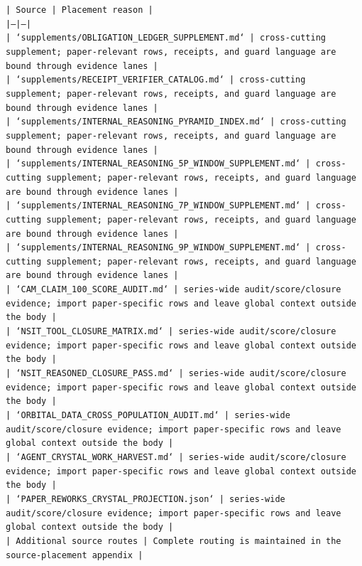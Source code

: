 \documentclass[11pt]{article}
\begin{document}
\noindent\texttt{| Source | Placement reason |}\\
\noindent\texttt{|---|---|}\\
\noindent\texttt{| `supplements/OBLIGATION\_LEDGER\_SUPPLEMENT.md` | cross-cutting supplement; paper-relevant rows, receipts, and guard language are bound through evidence lanes |}\\
\noindent\texttt{| `supplements/RECEIPT\_VERIFIER\_CATALOG.md` | cross-cutting supplement; paper-relevant rows, receipts, and guard language are bound through evidence lanes |}\\
\noindent\texttt{| `supplements/INTERNAL\_REASONING\_PYRAMID\_INDEX.md` | cross-cutting supplement; paper-relevant rows, receipts, and guard language are bound through evidence lanes |}\\
\noindent\texttt{| `supplements/INTERNAL\_REASONING\_5P\_WINDOW\_SUPPLEMENT.md` | cross-cutting supplement; paper-relevant rows, receipts, and guard language are bound through evidence lanes |}\\
\noindent\texttt{| `supplements/INTERNAL\_REASONING\_7P\_WINDOW\_SUPPLEMENT.md` | cross-cutting supplement; paper-relevant rows, receipts, and guard language are bound through evidence lanes |}\\
\noindent\texttt{| `supplements/INTERNAL\_REASONING\_9P\_WINDOW\_SUPPLEMENT.md` | cross-cutting supplement; paper-relevant rows, receipts, and guard language are bound through evidence lanes |}\\
\noindent\texttt{| `CAM\_CLAIM\_100\_SCORE\_AUDIT.md` | series-wide audit/score/closure evidence; import paper-specific rows and leave global context outside the body |}\\
\noindent\texttt{| `NSIT\_TOOL\_CLOSURE\_MATRIX.md` | series-wide audit/score/closure evidence; import paper-specific rows and leave global context outside the body |}\\
\noindent\texttt{| `NSIT\_REASONED\_CLOSURE\_PASS.md` | series-wide audit/score/closure evidence; import paper-specific rows and leave global context outside the body |}\\
\noindent\texttt{| `ORBITAL\_DATA\_CROSS\_POPULATION\_AUDIT.md` | series-wide audit/score/closure evidence; import paper-specific rows and leave global context outside the body |}\\
\noindent\texttt{| `AGENT\_CRYSTAL\_WORK\_HARVEST.md` | series-wide audit/score/closure evidence; import paper-specific rows and leave global context outside the body |}\\
\noindent\texttt{| `PAPER\_REWORKS\_CRYSTAL\_PROJECTION.json` | series-wide audit/score/closure evidence; import paper-specific rows and leave global context outside the body |}\\
\noindent\texttt{| Additional source routes | Complete routing is maintained in the source-placement appendix |}\\
\end{document}
